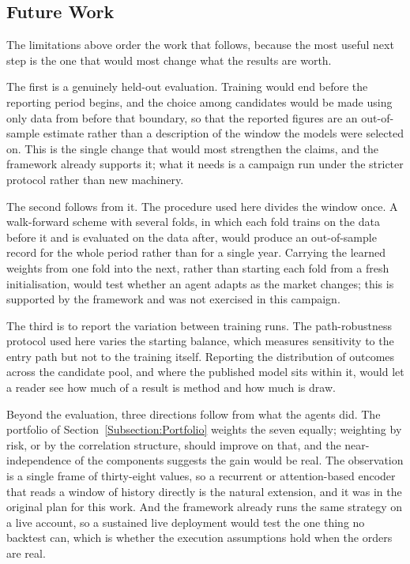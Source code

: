 \subsection{Future Work}
\label{Subsection:FutureWork}

The limitations above order the work that follows, because the most useful next step is the one that would most change what the results are worth.

The first is a genuinely held-out evaluation. Training would end before the reporting period begins, and the choice among candidates would be made using only data from before that boundary, so that the reported figures are an out-of-sample estimate rather than a description of the window the models were selected on. This is the single change that would most strengthen the claims, and the framework already supports it; what it needs is a campaign run under the stricter protocol rather than new machinery.

The second follows from it. The procedure used here divides the window once. A walk-forward scheme with several folds, in which each fold trains on the data before it and is evaluated on the data after, would produce an out-of-sample record for the whole period rather than for a single year. Carrying the learned weights from one fold into the next, rather than starting each fold from a fresh initialisation, would test whether an agent adapts as the market changes; this is supported by the framework and was not exercised in this campaign.

The third is to report the variation between training runs. The path-robustness protocol used here varies the starting balance, which measures sensitivity to the entry path but not to the training itself. Reporting the distribution of outcomes across the candidate pool, and where the published model sits within it, would let a reader see how much of a result is method and how much is draw.

Beyond the evaluation, three directions follow from what the agents did. The portfolio of Section~\ref{Subsection:Portfolio} weights the seven equally; weighting by risk, or by the correlation structure, should improve on that, and the near-independence of the components suggests the gain would be real. The observation is a single frame of thirty-eight values, so a recurrent or attention-based encoder that reads a window of history directly is the natural extension, and it was in the original plan for this work. And the framework already runs the same strategy on a live account, so a sustained live deployment would test the one thing no backtest can, which is whether the execution assumptions hold when the orders are real.

